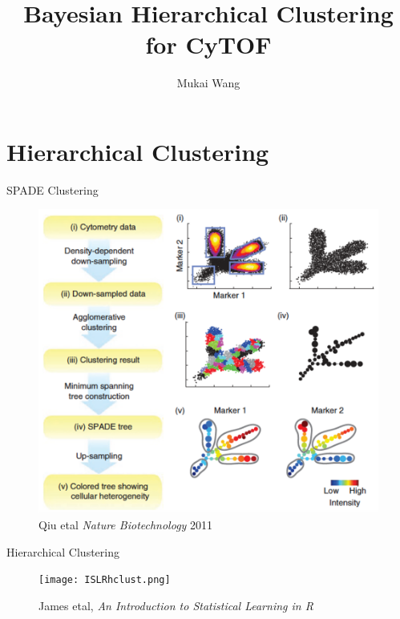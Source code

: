 \documentclass{beamer}
\begin{document}
	\title[Bayesian Hierarchical Clustering]{Bayesian Hierarchical Clustering for CyTOF}
	\author{Mukai Wang}
	
	\begin{frame}
		\titlepage
	\end{frame}
	
	\begin{frame}
		\tableofcontents[hideallsubsections]
	\end{frame}

	\section{Hierarchical Clustering}
	
	
	
	
	\begin{frame}{SPADE Clustering}
		\begin{figure}[htbp]
			\centering
			\includegraphics[scale=0.5]{SPADE.png}
			\caption*{Qiu etal \emph{Nature Biotechnology} 2011}
		\end{figure}
	\end{frame}
	
	\begin{frame}{Hierarchical Clustering}
		\begin{figure}[htbp]
			\centering
			\texttt{[image: ISLRhclust.png]}
			\caption*{James etal, \emph{An Introduction to Statistical Learning in R}}
		\end{figure}
	\end{frame}
\end{document}
